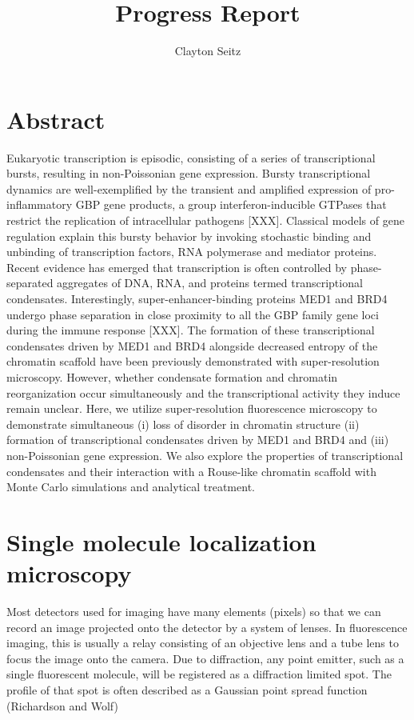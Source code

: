 \documentclass{article}
\begin{document}
\title{Progress Report}
\author{Clayton Seitz}
\maketitle
\thispagestyle{empty}


\section{Abstract}

Eukaryotic transcription is episodic, consisting of a series of transcriptional bursts, resulting in non-Poissonian gene expression. Bursty transcriptional dynamics are well-exemplified by the transient and amplified expression of pro-inflammatory GBP gene products, a group interferon-inducible GTPases that restrict the replication of intracellular pathogens [XXX]. Classical models of gene regulation explain this bursty behavior by invoking stochastic binding and unbinding of transcription factors, RNA polymerase and mediator proteins. Recent evidence has emerged that transcription is often controlled by phase-separated aggregates of DNA, RNA, and proteins termed transcriptional condensates. Interestingly, super-enhancer-binding proteins MED1 and BRD4 undergo phase separation in close proximity to all the GBP family gene loci during the immune response [XXX]. The formation of these transcriptional condensates driven by MED1 and BRD4 alongside decreased entropy of the chromatin scaffold have been previously demonstrated with super-resolution microscopy. However, whether condensate formation and chromatin reorganization occur simultaneously and the transcriptional activity they induce remain unclear. Here, we utilize super-resolution fluorescence microscopy to demonstrate simultaneous (i) loss of disorder in chromatin structure (ii) formation of transcriptional condensates driven by MED1 and BRD4 and (iii) non-Poissonian gene expression. We also explore the properties of transcriptional condensates and their interaction with a Rouse-like chromatin scaffold with Monte Carlo simulations and analytical treatment.

\section{Single molecule localization microscopy}

Most detectors used for imaging have many elements (pixels) so that we can record an image projected onto the detector by a system of lenses. In fluorescence imaging, this is usually a relay consisting of an objective lens and a tube lens to focus the image onto the camera. Due to diffraction, any point emitter, such as a single fluorescent molecule, will be registered as a diffraction limited spot. The profile of that spot is often described as a Gaussian point spread function (Richardson and Wolf)
\end{document}

